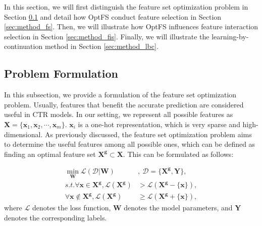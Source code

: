 \documentclass[sigconf]{acmart}
\begin{document}
In this section, we will first distinguish the feature set optimization problem in Section \ref{sec:form} and detail how OptFS conduct feature selection in Section \ref{sec:method_fs}. Then, we will illustrate how OptFS influences feature interaction selection in Section \ref{sec:method_fis}. Finally, we will illustrate the learning-by-continuation method in Section \ref{sec:method_lbc}.


\subsection{Problem Formulation}
\label{sec:form}

In this subsection, we provide a formulation of the feature set optimization problem. Usually, features that benefit the accurate prediction are considered useful in CTR models. In our setting, we represent all possible features as $\mathbf{X} = \{\mathbf{x}_{1}, \mathbf{x}_{2}, \cdots, \mathbf{x}_{m}\}$. $\mathbf{x}_{i}$ is a one-hot representation, which is very sparse and high-dimensional. As previously discussed, the feature set optimization problem aims to determine the useful features among all possible ones, which can be defined as finding an optimal feature set $\mathbf{X}^\mathbf{g} \subset \mathbf{X}$. This can be formulated as follows:

\begin{equation}
\begin{aligned}
    \min_{\mathbf{W}} \mathcal{L}(\mathcal{D}|\mathbf{W}) & , \ 
    \mathcal{D} = \{ \mathbf{X}^\mathbf{g}, \mathbf{Y}\}, \\
    s.t. \forall \mathbf{x} \in \mathbf{X}^\mathbf{g}, \mathcal{L}(\mathbf{X}^\mathbf{g}) & > \mathcal{L}(\mathbf{X}^\mathbf{g}-\{\mathbf{x}\}), \\
    \forall \mathbf{x} \notin \mathbf{X}^\mathbf{g}, \mathcal{L}(\mathbf{X}^\mathbf{g}) & \ge \mathcal{L}(\mathbf{X}^\mathbf{g}+\{\mathbf{x}\}),
\end{aligned}
\end{equation}
where $\mathcal{L}$ denotes the loss function, $\mathbf{W}$ denotes the model parameters, and $\mathbf{Y}$ denotes the corresponding labels.
\end{document}
